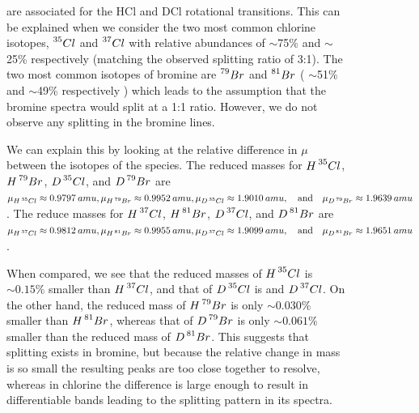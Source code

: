 \documentclass[titlepage]{article}
\begin{document}
\begin{figure}[hbtp]
    are associated for the HCl and DCl rotational 
    transitions. This can be explained when we consider the two most common chlorine isotopes, \(\prescript{35}{}{Cl}\) 
    and \(\prescript{37}{}{Cl}\) with relative abundances of 
        \(\sim\)75\% and \(\sim\)25\% respectively
    (matching the observed splitting ratio of 3:1).
    The two most common isotopes of bromine are  \(\prescript{79}{}{Br}\) 
    and \(\prescript{81}{}{Br}\) (
        \(\sim\)51\% and \(\sim\)49\% respectively
    ) which leads to the assumption that the bromine spectra would split at a 1:1 ratio. However, we do not observe any splitting in the bromine lines. 
    \\
    \par\indent We can explain this by looking at the relative difference in \(\mu\) between the isotopes of the species.  
    The reduced masses for \(H\prescript{35}{}{Cl}\),
    \(H\prescript{79}{}{Br}\), \(D\prescript{35}{}{Cl}\), and \(D\prescript{79}{}{Br}\) are \(\mu_{H\prescript{35}{}{Cl}}\approx 0.9797\hspace*{2pt}amu,
    \mu_{H\prescript{79}{}{Br}} \approx 0.9952\hspace*{2pt}amu, 
    \mu_{D\prescript{35}{}{Cl}} \approx 1.9010\hspace*{2pt}amu,
    \quad \text{and} \quad
    \mu_{D\prescript{79}{}{Br}} \approx 1.9639\hspace*{2pt}amu
    \). The reduce masses for \(H\prescript{37}{}{Cl}\),
    \(H\prescript{81}{}{Br}\), \(D\prescript{37}{}{Cl}\), and \(D\prescript{81}{}{Br}\) are \(
        \mu_{H\prescript{37}{}{Cl}} \approx 0.9812\hspace*{2pt}amu,
        \mu_{H\prescript{81}{}{Br}} \approx 0.9955\hspace*{2pt}amu,
        \mu_{D\prescript{37}{}{Cl}} \approx 1.9099\hspace*{2pt}amu,
        \quad \text{and} \quad
        \mu_{D\prescript{81}{}{Br}} \approx 1.9651\hspace*{2pt}amu
    \). 
    \\
    \par \indent When compared, we see that the reduced masses of 
    \(H\prescript{35}{}{Cl}\) is \(\sim 0.15\%\) smaller than \(H\prescript{37}{}{Cl}\), 
    and that of  \(D\prescript{35}{}{Cl}\) is 
    and \(D\prescript{37}{}{Cl}\). On the other hand, the reduced 
    mass of \(H\prescript{79}{}{Br}\) is only \(\sim 0.030\%\) 
    smaller than \(H\prescript{81}{}{Br}\), whereas
    that of \(D\prescript{79}{}{Br}\) is only \(\sim 0.061\%\) smaller
    than the reduced mass of \(D\prescript{81}{}{Br}\). This suggests that splitting exists in bromine, but because the
    relative change in mass is so small the resulting peaks are too close together to resolve, whereas in chlorine the 
    difference is large enough to result in differentiable 
    bands leading to 
    the splitting pattern in its spectra. 
\end{figure}
    
\end{document}
